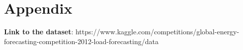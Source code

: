 \documentclass[12pt, a4paper,twoside]{report}
\theoremstyle{plain} %
\theoremstyle{definition} %
\theoremstyle{remark} %
\numberwithin{equation}{chapter}
\begin{document}
\newpage
\appendix
\chapter{Appendix}
\textbf{Link to the dataset}: https://www.kaggle.com/competitions/global-energy-forecasting-competition-2012-load-forecasting/data
\newline
\newline




\end{document}
